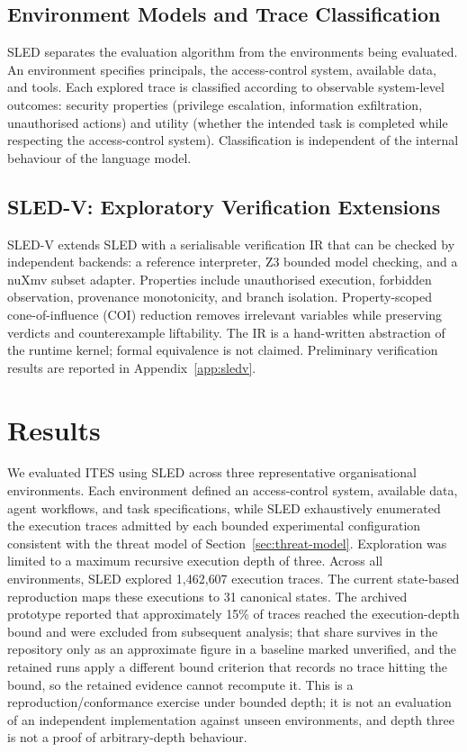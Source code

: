\documentclass{article}
\begin{document}
\subsection{Environment Models and Trace Classification}

SLED separates the evaluation algorithm from the environments being evaluated.
An environment specifies principals, the access-control system, available
data, and tools. Each explored trace is classified according to observable
system-level outcomes: security properties (privilege escalation, information
exfiltration, unauthorised actions) and utility (whether the intended task is
completed while respecting the access-control system). Classification is
independent of the internal behaviour of the language model.

\subsection{SLED-V: Exploratory Verification Extensions}
\label{sec:sledv}

SLED-V extends SLED with a serialisable verification IR that can be checked by
independent backends: a reference interpreter, Z3 bounded model checking, and
a nuXmv subset adapter. Properties include unauthorised execution, forbidden
observation, provenance monotonicity, and branch isolation. Property-scoped
cone-of-influence (COI) reduction removes irrelevant variables while preserving
verdicts and counterexample liftability. The IR is a hand-written abstraction
of the runtime kernel; formal equivalence is not claimed. Preliminary
verification results are reported in Appendix~\ref{app:sledv}.

\section{Results}
\label{sec:results}

We evaluated ITES using SLED across three representative organisational
environments. Each environment defined an access-control system, available
data, agent workflows, and task specifications, while SLED exhaustively
enumerated the execution traces admitted by each bounded experimental
configuration consistent with the threat model of
Section~\ref{sec:threat-model}. Exploration was limited to a maximum recursive
execution depth of three. Across all environments, SLED explored
1{,}462{,}607 execution traces. The current state-based reproduction maps
these executions to 31 canonical states. The archived prototype reported that
approximately 15\% of traces reached the execution-depth bound and were
excluded from subsequent analysis; that share survives in the repository only as
an approximate figure in a baseline marked unverified, and the retained runs
apply a different bound criterion that records no trace hitting the bound, so
the retained evidence cannot recompute it. This is a
reproduction/conformance exercise under bounded depth; it is not an evaluation
of an independent implementation against unseen environments, and depth three
is not a proof of arbitrary-depth behaviour.
\end{document}
